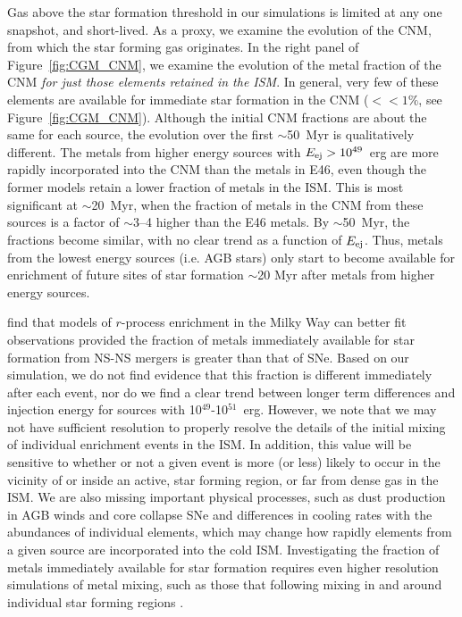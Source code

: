 \documentclass[twocolumn]{aastex62}
\begin{document}
Gas above the star formation threshold in our simulations is limited at any one snapshot, and short-lived. As a proxy, we examine the evolution of the CNM, from which the star forming gas originates. In the right panel of Figure~\ref{fig:CGM_CNM}, we examine the evolution of the metal fraction of the CNM \textit{for just those elements retained in the ISM}. In general, very few of these elements are available for immediate star formation in the CNM ($<< 1\%$, see Figure~\ref{fig:CGM_CNM}). Although the initial CNM fractions are about the same for each source, the evolution over the first $\sim$50~Myr is qualitatively different.  The metals from higher energy sources with $E_{\rm ej} > 10^{49}$~erg are more rapidly incorporated into the CNM than the metals in E46, even though the former models retain a lower fraction of metals in the ISM. This is most significant at $\sim$20~Myr, when the fraction of metals in the CNM from these sources is a factor of $\sim$3--4 higher than the E46 metals. By $\sim$50~Myr, the fractions become similar, with no clear trend as a function of $E_{\rm ej}$. Thus, metals from the lowest energy sources (i.e. AGB stars) only start to become available for enrichment of future sites of star formation $\sim$20 Myr after metals from higher energy sources.

\cite{SchonrichWeinberg2019} find that models of $r$-process enrichment in the Milky Way can better fit observations provided the fraction of metals immediately available for star formation from NS-NS mergers is greater than that of SNe. Based on our simulation, we do not find evidence that this fraction is different immediately after each event, nor do we find a clear trend between longer term differences and injection energy for sources with 10$^{49}$-10$^{51}$~erg. However, we note that we may not have sufficient resolution to properly resolve the details of the initial mixing of individual enrichment events in the ISM. In addition, this value will be sensitive to whether or not a given event is more (or less) likely to occur in the vicinity of or inside an active, star forming region, or far from dense gas in the ISM. We are also missing important physical processes, such as dust production in AGB winds and core collapse SNe and differences in cooling rates with the abundances of individual elements, which may change how rapidly elements from a given source are incorporated into the cold ISM. Investigating the fraction of metals immediately available for star formation requires even higher resolution simulations of metal mixing, such as those that following mixing in and around individual star forming regions \citep[e.g.][]{Kuffmeier2016,Armillotta2018}.
\end{document}
